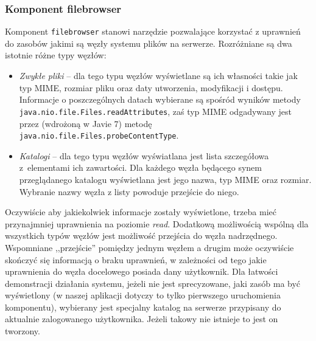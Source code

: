 \documentclass{classrep}
\begin{document}
\subsubsection{Komponent filebrowser}
Komponent \texttt{filebrowser} stanowi narzędzie pozwalające korzystać z uprawnień
do zasobów jakimi są węzły systemu plików na serwerze. Rozróżniane są dwa istotnie
różne typy węzłów:

\begin{itemize}
\item \emph{Zwykłe pliki} -- dla tego typu węzłów wyświetlane są ich własności
takie jak typ MIME, rozmiar pliku oraz daty utworzenia, modyfikacji i dostępu.
Informacje o poszczególnych datach wybierane są spośród wyników
metody \texttt{java.nio.file.Files.readAttributes}, zaś typ MIME
odgadywany jest przez (wdrożoną w Javie 7) metodę \texttt{java.nio.file.Files.probeContentType}.

\item \emph{Katalogi} -- dla tego typu węzłów wyświatlana jest lista szczegółowa
z~elementami ich zawartości. Dla każdego węzła będącego synem przeglądanego katalogu
wyświetlana jest jego nazwa, typ MIME oraz rozmiar. Wybranie nazwy węzła z listy
powoduje przejście do niego.
\end{itemize}



Oczywiście aby jakiekolwiek informacje zostały wyświetlone, trzeba mieć przynajmniej uprawnienia
na poziomie \emph{read}. Dodatkową możliwością wspólną dla wszystkich typów węzłów
jest możliwość przejścia do węzła nadrzędnego. Wspomniane ,,przejście'' pomiędzy jednym
węzłem a drugim może oczywiście skończyć się informacją o braku uprawnień, w zależności
od tego jakie uprawnienia do węzła docelowego posiada dany użytkownik. Dla łatwości demonstracji
działania systemu, jeżeli nie jest sprecyzowane, jaki zasób ma być wyświetlony (w naszej aplikacji
dotyczy to tylko pierwszego uruchomienia komponentu), wybierany jest specjalny katalog na serwerze przypisany do aktualnie zalogowanego użytkownika.
Jeżeli takowy nie istnieje to jest on tworzony.


\end{document}
